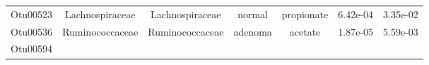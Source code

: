 \documentclass[11pt,]{article}
\begin{document}
\begin{longtable}[]{@{}ccccccc@{}}
\begin{minipage}[t]{0.09\columnwidth}\centering\strut
Otu00523\strut
\end{minipage} & \begin{minipage}[t]{0.17\columnwidth}\centering\strut
Lachnospiraceae\strut
\end{minipage} & \begin{minipage}[t]{0.17\columnwidth}\centering\strut
Lachnospiraceae\strut
\end{minipage} & \begin{minipage}[t]{0.09\columnwidth}\centering\strut
normal\strut
\end{minipage} & \begin{minipage}[t]{0.11\columnwidth}\centering\strut
propionate\strut
\end{minipage} & \begin{minipage}[t]{0.09\columnwidth}\centering\strut
6.42e-04\strut
\end{minipage} & \begin{minipage}[t]{0.09\columnwidth}\centering\strut
3.35e-02\strut
\end{minipage}\tabularnewline
\begin{minipage}[t]{0.09\columnwidth}\centering\strut
Otu00536\strut
\end{minipage} & \begin{minipage}[t]{0.17\columnwidth}\centering\strut
Ruminococcaceae\strut
\end{minipage} & \begin{minipage}[t]{0.17\columnwidth}\centering\strut
Ruminococcaceae\strut
\end{minipage} & \begin{minipage}[t]{0.09\columnwidth}\centering\strut
adenoma\strut
\end{minipage} & \begin{minipage}[t]{0.11\columnwidth}\centering\strut
acetate\strut
\end{minipage} & \begin{minipage}[t]{0.09\columnwidth}\centering\strut
1.87e-05\strut
\end{minipage} & \begin{minipage}[t]{0.09\columnwidth}\centering\strut
5.59e-03\strut
\end{minipage}\tabularnewline
\begin{minipage}[t]{0.09\columnwidth}\centering\strut
Otu00594\strut
\end{minipage} & \begin{minipage}[t]{0.17\columnwidth}\centering\strut

\end{minipage}
\end{longtable}
\end{document}
